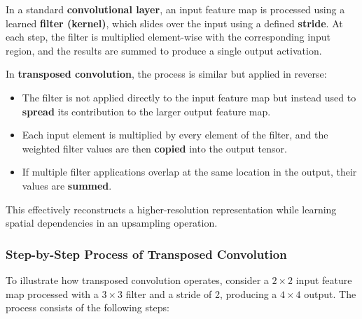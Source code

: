 \noindent In a standard \textbf{convolutional layer}, an input feature map is processed using a learned \textbf{filter (kernel)}, which slides over the input using a defined \textbf{stride}. At each step, the filter is multiplied element-wise with the corresponding input region, and the results are summed to produce a single output activation.

\noindent In \textbf{transposed convolution}, the process is similar but applied in reverse:
\begin{itemize}
	\item The filter is not applied directly to the input feature map but instead used to \textbf{spread} its contribution to the larger output feature map.
	\item Each input element is multiplied by every element of the filter, and the weighted filter values are then \textbf{copied} into the output tensor.
	\item If multiple filter applications overlap at the same location in the output, their values are \textbf{summed}.
\end{itemize}

\noindent This effectively reconstructs a higher-resolution representation while learning spatial dependencies in an upsampling operation.

\subsubsection{Step-by-Step Process of Transposed Convolution}

\noindent To illustrate how transposed convolution operates, consider a $2 \times 2$ input feature map processed with a $3 \times 3$ filter and a stride of 2, producing a $4 \times 4$ output. The process consists of the following steps:

